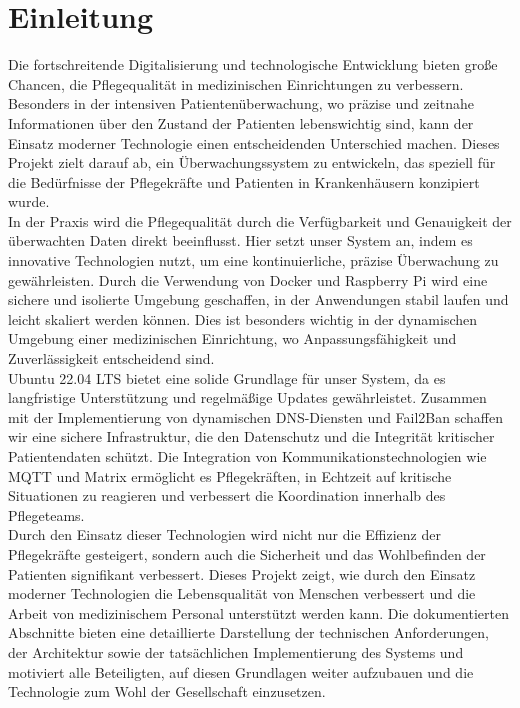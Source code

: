 
\section{Einleitung}

Die fortschreitende Digitalisierung und technologische Entwicklung bieten große Chancen, die Pflegequalität in medizinischen Einrichtungen zu verbessern. Besonders in der intensiven Patientenüberwachung, wo präzise und zeitnahe Informationen über den Zustand der Patienten lebenswichtig sind, kann der Einsatz moderner Technologie einen entscheidenden Unterschied machen. Dieses Projekt zielt darauf ab, ein Überwachungssystem zu entwickeln, das speziell für die Bedürfnisse der Pflegekräfte und Patienten in Krankenhäusern konzipiert wurde.
\\

In der Praxis wird die Pflegequalität durch die Verfügbarkeit und Genauigkeit der überwachten Daten direkt beeinflusst. Hier setzt unser System an, indem es innovative Technologien nutzt, um eine kontinuierliche, präzise Überwachung zu gewährleisten. Durch die Verwendung von Docker und Raspberry Pi wird eine sichere und isolierte Umgebung geschaffen, in der Anwendungen stabil laufen und leicht skaliert werden können. Dies ist besonders wichtig in der dynamischen Umgebung einer medizinischen Einrichtung, wo Anpassungsfähigkeit und Zuverlässigkeit entscheidend sind.
\\

Ubuntu 22.04 LTS bietet eine solide Grundlage für unser System, da es langfristige Unterstützung und regelmäßige Updates gewährleistet. Zusammen mit der Implementierung von dynamischen DNS-Diensten und Fail2Ban schaffen wir eine sichere Infrastruktur, die den Datenschutz und die Integrität kritischer Patientendaten schützt. Die Integration von Kommunikationstechnologien wie MQTT und Matrix ermöglicht es Pflegekräften, in Echtzeit auf kritische Situationen zu reagieren und verbessert die Koordination innerhalb des Pflegeteams.
\\

Durch den Einsatz dieser Technologien wird nicht nur die Effizienz der Pflegekräfte gesteigert, sondern auch die Sicherheit und das Wohlbefinden der Patienten signifikant verbessert. Dieses Projekt zeigt, wie durch den Einsatz moderner Technologien die Lebensqualität von Menschen verbessert und die Arbeit von medizinischem Personal unterstützt werden kann. Die dokumentierten Abschnitte bieten eine detaillierte Darstellung der technischen Anforderungen, der Architektur sowie der tatsächlichen Implementierung des Systems und motiviert alle Beteiligten, auf diesen Grundlagen weiter aufzubauen und die Technologie zum Wohl der Gesellschaft einzusetzen.

